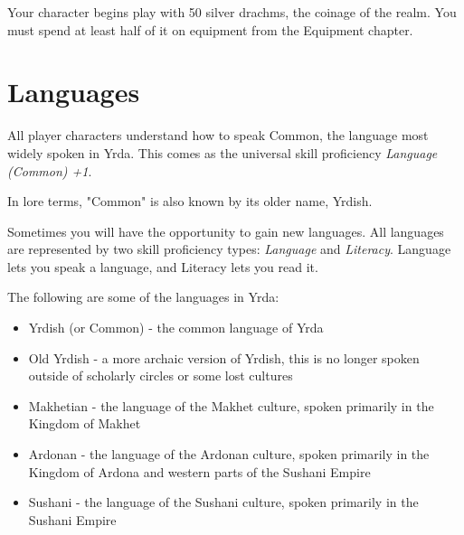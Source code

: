 \begin{multicols}{2}
Your character begins play with 50 silver drachms, the coinage of 
the realm. You must spend at least half of it on equipment from the 
Equipment chapter.

\section{Languages}

All player characters understand how to speak Common, the language most
widely spoken in Yrda. This comes as the universal skill proficiency
\textit{Language (Common) +1}.  

In lore terms, "Common" is also known by its older name, Yrdish.

Sometimes you will have the opportunity to gain new languages. All languages
are represented by two skill proficiency types: \textit{Language} and \textit{Literacy}.
Language lets you speak a language, and Literacy lets you read it.

The following are some of the languages in Yrda:

\begin{itemize}
    \item Yrdish (or Common) - the common language of Yrda
    \item Old Yrdish - a more archaic version of Yrdish, this is no longer spoken
    outside of scholarly circles or some lost cultures
    \item Makhetian - the language of the Makhet culture, spoken primarily in the 
    Kingdom of Makhet
    \item Ardonan - the language of the Ardonan culture, spoken primarily in the 
    Kingdom of Ardona and western parts of the Sushani Empire
    \item Sushani - the language of the Sushani culture, spoken primarily in the 
    Sushani Empire
\end{itemize}

\end{multicols}

